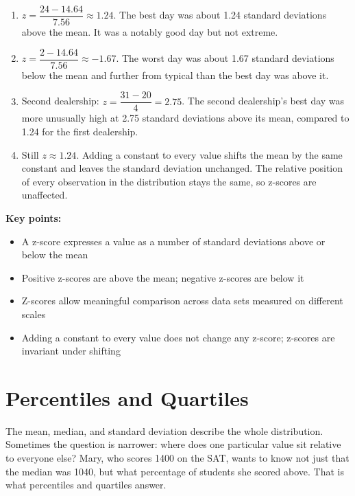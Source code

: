 \begin{Answer}[ref={ex:zscores}]
\begin{enumerate}  
    \item $z = \dfrac{24 - 14.64}{7.56} \approx 1.24$. The best day
    was about 1.24 standard deviations above the mean. It was a
    notably good day but not extreme.
    \item $z = \dfrac{2 - 14.64}{7.56} \approx -1.67$. The worst day
    was about 1.67 standard deviations below the mean and further from
    typical than the best day was above it.
    \item Second dealership: $z = \dfrac{31 - 20}{4} = 2.75$.
    The second dealership's best day was more unusually high at 2.75
    standard deviations above its mean, compared to 1.24 for the
    first dealership.
    \item Still $z \approx 1.24$. Adding a constant to every value
    shifts the mean by the same constant and leaves the standard
    deviation unchanged. The relative position of every observation
    in the distribution stays the same, so z-scores are unaffected.
\end{enumerate}
\end{Answer}

\textbf{Key points:}
\begin{itemize}
    \item A z-score expresses a value as a number of standard
    deviations above or below the mean
    \item Positive z-scores are above the mean; negative z-scores
    are below it
    \item Z-scores allow meaningful comparison across data sets
    measured on different scales
    \item Adding a constant to every value does not change any
    z-score; z-scores are invariant under shifting
\end{itemize}

\section{Percentiles and Quartiles}

The mean, median, and standard deviation describe the whole
distribution. Sometimes the question is narrower: where does one
particular value sit relative to everyone else? Mary, who scores
1400 on the SAT, wants to know not just that the median was 1040,
but what percentage of students she scored above. That is what
percentiles and quartiles answer.

